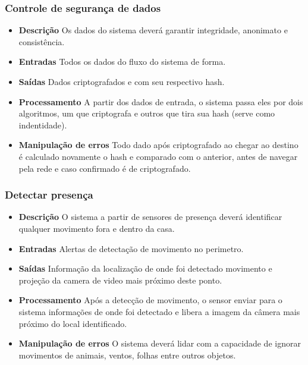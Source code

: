 \subsubsection{Controle de segurança de dados}
\begin{itemize}

	\item \textbf{Descrição}
	Os dados do sistema deverá garantir integridade, anonimato e consistência.

	\item \textbf{Entradas}
    Todos os dados do fluxo do sistema de forma.

	\item \textbf{Saídas}
	Dados criptografados e com seu respectivo hash.

	\item \textbf{Processamento}
	A partir dos dados de entrada, o sistema passa eles por dois algoritmos, um que criptografa e outros que tira sua hash (serve como indentidade).

	\item \textbf{Manipulação de erros}
	Todo dado após criptografado ao chegar ao destino é calculado novamente o hash e comparado com o anterior, antes de navegar pela rede e caso confirmado é de criptografado.

\end{itemize}

\subsubsection{Detectar presença}
\begin{itemize}

	\item \textbf{Descrição}
	O sistema a partir de sensores de presença deverá identificar qualquer movimento fora e dentro da casa.

	\item \textbf{Entradas}
	Alertas de detectação de movimento no perimetro.

	\item \textbf{Saídas}
	Informação da localização de onde foi detectado movimento e projeção da camera de video mais próximo deste ponto.

	\item \textbf{Processamento}
	Após a detecção de movimento, o sensor enviar para o sistema informações de onde foi detectado e libera a imagem da câmera mais próximo do local identificado.

	\item \textbf{Manipulação de erros}
	O sistema deverá lidar com a capacidade de ignorar movimentos de animais, ventos, folhas entre outros objetos.

\end{itemize}

